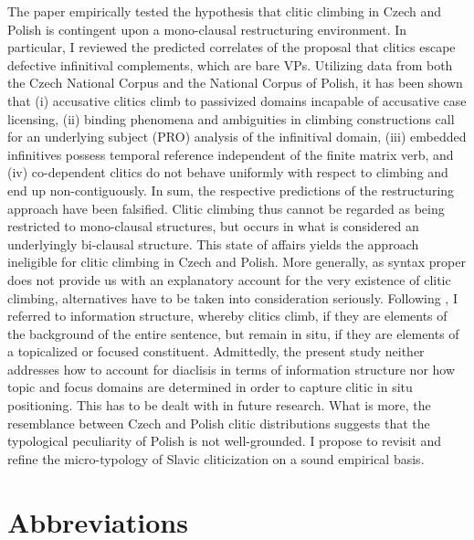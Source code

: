 \documentclass[output=paper,colorlinks,citecolor=brown]{langscibook}
\begin{document}
The paper empirically tested the hypothesis that clitic climbing in Czech and Polish is contingent upon a mono-clausal restructuring environment. In particular, I reviewed the predicted correlates of the proposal that clitics escape defective infinitival complements, which are bare VPs. Utilizing data from both the Czech National Corpus and the National Corpus of Polish, it has been shown that (i) accusative clitics climb to passivized domains incapable of accusative case licensing, (ii) binding phenomena and ambiguities in climbing constructions call for an underlying subject (PRO) analysis of the infinitival domain, (iii) embedded infinitives possess temporal reference independent of the finite matrix verb, and (iv) co-dependent clitics do not behave uniformly with respect to climbing and end up non-contiguously. In sum, the respective predictions of the restructuring approach have been falsified. Clitic climbing thus cannot be regarded as being restricted to mono-clausal structures, but occurs in what is considered an underlyingly bi-clausal structure. This state of affairs yields the approach ineligible for clitic climbing in Czech and Po\-lish. More generally, as syntax proper does not provide us with an explanatory account for the very existence of clitic climbing, alternatives have to be taken into consideration seriously. Following \citet{Junghanns2002a}, I referred to information structure, whereby clitics climb, if they are elements of the background of the entire sentence, but remain in situ, if they are elements of a topicalized or focused constituent. Admittedly, the present study neither addresses how to account for diaclisis in terms of information structure nor how topic and focus domains are determined in order to capture clitic in situ positioning. This has to be dealt with in future research. What is more, the resemblance between Czech and Polish clitic distributions suggests that the typological peculiarity of Polish is not well-grounded. I propose to revisit and refine the micro-typology of Slavic cliticization on a sound empirical basis.

\section*{Abbreviations}
\end{document}
